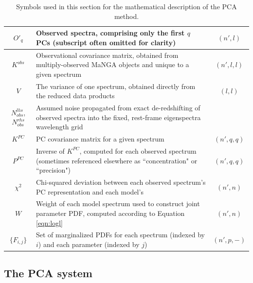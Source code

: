 \begin{table}
\begin{tabular}{||c|p{5in}|c||}
        $O'_q$ & Observed spectra, comprising only the first $q$ PCs (subscript often omitted for clarity) & $(n',l)$ \\ \hline
        $K^{obs}$ & Observational covariance matrix, obtained from multiply-observed MaNGA objects and unique to a given spectrum & $(n',l,l)$ \\ \hline
        $V$ & The variance of one spectrum, obtained directly from the reduced data products & $(l,l)$ \\ \hline
        $N^{lhs}_{obs}$, $N^{rhs}_{obs}$ & Assumed noise propagated from exact de-redshifting of observed spectra into the fixed, rest-frame eigenspectra wavelength grid & \\ \hline
        $K^{PC}$ & PC covariance matrix for a given spectrum & $(n',q,q)$ \\ \hline
        $P^{PC}$ & Inverse of $K^{PC}$, computed for each observed spectrum (sometimes referenced elsewhere as ``concentration" or ``precision") & $(n',q,q)$ \\ \hline
        $\chi^2$ & Chi-squared deviation between each observed spectrum's PC representation and each model's & $(n',n)$ \\ \hline
        $W$ & Weight of each model spectrum used to construct joint parameter PDF, computed according to Equation \ref{eqn:logl} & $(n',n)$ \\ \hline
        $\{F_{i,j}\}$ & Set of marginalized PDFs for each spectrum (indexed by $i$) and each parameter (indexed by $j$) & $(n',p,-)$ \\ \hline
    \end{tabular}
    \caption[PCA method notation]{\fixspacing Symbols used in this section for the mathematical description of the PCA method.}
    \label{tab:vars}
\end{table}

\subsection{The PCA system}
\label{chap1:subsec:run_pca}

